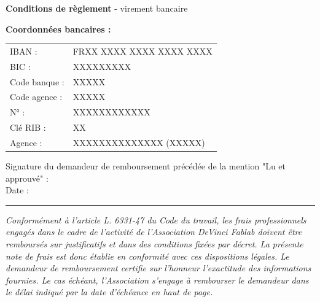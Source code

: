 \documentclass[11pt,a4paper]{article}
\begin{document}
\vspace{\fill}
\begin{minipage}[t]{0.55\textwidth}
    \textbf{Conditions de règlement} - virement bancaire

    \vspace{0.2cm}

    \textbf{Coordonnées bancaires :}
    \vspace{0.15cm}

    \begin{tabular}{lp{6.5cm}}
        IBAN :        & FRXX XXXX XXXX XXXX XXXX \\
        BIC :         & XXXXXXXXX                \\
        Code banque : & XXXXX                    \\
        Code agence : & XXXXX                    \\
        N° :          & XXXXXXXXXXXX             \\
        Clé RIB :     & XX                       \\
        Agence :      & XXXXXXXXXXXXXX (XXXXX)   \\
    \end{tabular}
\end{minipage}\begin{minipage}[t]{0.45\textwidth}
    \begin{framed}
        Signature du demandeur de remboursement précédée de la mention "Lu et approuvé" :
        \vspace{2.5cm} \\
        Date : \rule{3cm}{0.75pt}
    \end{framed}
\end{minipage}



\vspace{0.5cm}
\textit{\footnotesize Conformément à l'article L. 6331-47 du Code du travail, les frais professionnels engagés dans le cadre de l'activité de l'Association DeVinci Fablab doivent être remboursés sur justificatifs et dans des conditions fixées par décret. La présente note de frais est donc établie en conformité avec ces dispositions légales. Le demandeur de remboursement certifie sur l'honneur l'exactitude des informations fournies. Le cas échéant, l'Association s'engage à rembourser le demandeur dans le délai indiqué par la date d'échéance en haut de page.}
\end{document}
